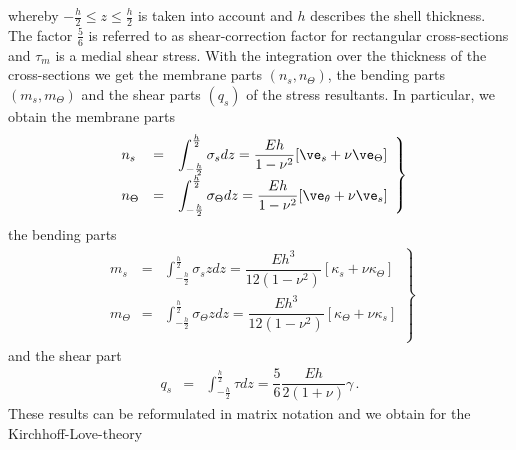 whereby $- \frac{h}{2} \le z \le \frac{h}{2}$ is taken into 
account and $h$ describes the shell thickness. 
The factor $\frac{5}{6}$ is referred to as 
shear-correction factor for rectangular cross-sections and 
$\tau_m$ is a medial shear stress. 
With the integration over the thickness of the 
cross-sections we get the membrane parts 
$(n_s, n_\Theta)$, the bending parts $(m_s, m_\Theta)$ and 
the shear parts $(q_s)$ of the stress resultants. 
In particular, we obtain the membrane parts 
\begin{eqnarray}
\left.
\begin{array}{lcl}
n_s & = & \displaystyle \int_{-\frac{h}{2}}^{\frac{h}{2}} \sigma_s dz =
\dfrac{Eh}{1-\nu^2} [\ve_s + \nu \ve_\Theta] \\
n_\Theta & = & \displaystyle \int_{-\frac{h}{2}}^{\frac{h}{2}} 
\sigma_\Theta dz =
\dfrac{Eh}{1-\nu^2} [\ve_\theta + \nu \ve_s]
\end{array}
\right\}
\end{eqnarray} 
the bending parts 
\begin{eqnarray}
\left.
\begin{array}{lcl}
m_s & = & \displaystyle \int_{-\frac{h}{2}}^{\frac{h}{2}} \sigma_s z dz =
\dfrac{Eh^3}{12 (1-\nu^2)} [\kappa_s + \nu \kappa_\Theta] \\
m_\Theta & = & \displaystyle \int_{-\frac{h}{2}}^{\frac{h}{2}} 
\sigma_\Theta z dz =
\dfrac{Eh^3}{12 (1-\nu^2)} [\kappa_\Theta + \nu \kappa_s] \\
\end{array}
\right\}
\end{eqnarray} 
and the shear part 
\begin{eqnarray}
q_s & = & \int_{-\frac{h}{2}}^{\frac{h}{2}} \tau dz =
\dfrac{5}{6} \dfrac{Eh}{2(1+\nu)} \gamma \, . 
\end{eqnarray} 
These results can be reformulated in matrix notation and 
we obtain for the Kirchhoff-Love-theory
